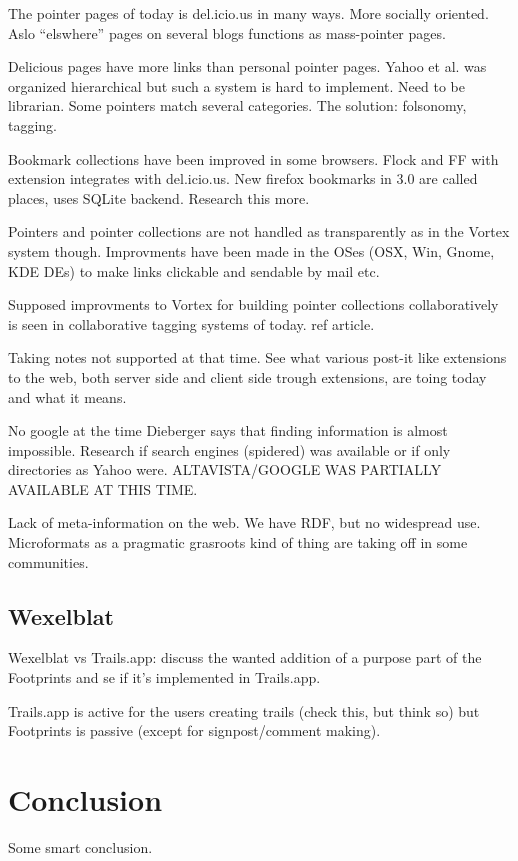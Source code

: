 \documentclass[12pt,a4paper]{article}
\begin{document}
The pointer pages of today is del.icio.us in many ways. More socially
oriented. Aslo ``elswhere'' pages on several blogs functions as mass-pointer
pages.

Delicious pages have more links than personal pointer pages. Yahoo et al. was
organized hierarchical but such a system is hard to implement. Need to be
librarian. Some pointers match several categories. The solution: folsonomy,
tagging.

Bookmark collections have been improved in some browsers. Flock and FF with
extension integrates with del.icio.us. New firefox bookmarks in 3.0 are called
places, uses SQLite backend. Research this more.

Pointers and pointer collections are not handled as transparently as in the
Vortex system though. Improvments have been made in the OSes (OSX, Win, Gnome,
KDE DEs) to make links clickable and sendable by mail etc.

Supposed improvments to Vortex for building pointer collections
collaboratively is seen in collaborative tagging systems of today. ref
article.

Taking notes not supported at that time. See what various post-it like
extensions to the web, both server side and client side trough extensions, are
toing today and what it means.

No google at the time Dieberger says that finding information is almost
impossible. Research if search engines (spidered) was available or if only
directories as Yahoo were. ALTAVISTA/GOOGLE WAS PARTIALLY AVAILABLE AT THIS
TIME.

Lack of meta-information on the web. We have RDF, but no widespread use.
Microformats as a pragmatic grasroots kind of thing are taking off in some
communities.


\subsection{Wexelblat}

Wexelblat vs Trails.app: discuss the wanted addition of a purpose part of the
Footprints and se if it's implemented in Trails.app.

Trails.app is active for the users creating trails (check this, but think so)
but Footprints is passive (except for signpost/comment making).

\section{Conclusion}

Some smart conclusion.

\section{}




\end{document}
